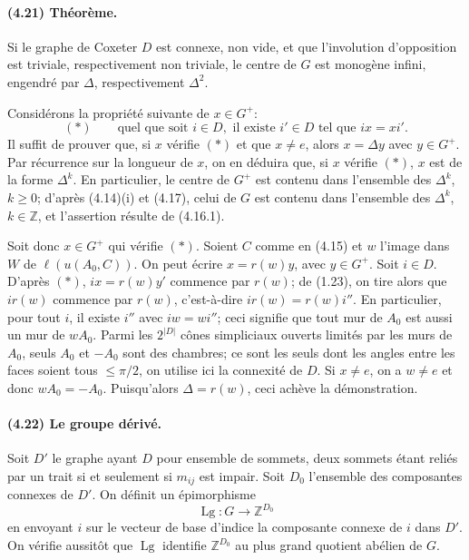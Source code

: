 \documentclass[10pt]{article}
\newcommand{\Z}{\mathbb Z}
\begin{document}
\paragraph{(4.21) Théorème.} Si le graphe de Coxeter \(D\) est connexe, non vide, et que l'involution d'opposition est triviale, respectivement non triviale, le centre de \(G\) est monogène infini, engendré par \(\Delta\), respectivement \(\Delta^2\).

Considérons la propriété suivante de \(x\in G^+\):
\[
(*)\qquad
\text{quel que soit }i\in D,\text{ il existe }i'\in D\text{ tel que }ix=xi'.
\]
Il suffit de prouver que, si \(x\) vérifie \((*)\) et que \(x\ne e\), alors \(x=\Delta y\) avec \(y\in G^+\). Par récurrence sur la longueur de \(x\), on en déduira que, si \(x\) vérifie \((*)\), \(x\) est de la forme \(\Delta^k\). En particulier, le centre de \(G^+\) est contenu dans l'ensemble des \(\Delta^k\), \(k\ge0\); d'après (4.14)(i) et (4.17), celui de \(G\) est contenu dans l'ensemble des \(\Delta^k\), \(k\in\Z\), et l'assertion résulte de (4.16.1).

Soit donc \(x\in G^+\) qui vérifie \((*)\). Soient \(C\) comme en (4.15) et \(w\) l'image dans \(W\) de \(\ell(u(A_0,C))\). On peut écrire \(x=r(w)y\), avec \(y\in G^+\). Soit \(i\in D\). D'après \((*)\), \(ix=r(w)y'\) commence par \(r(w)\); de (1.23), on tire alors que \(ir(w)\) commence par \(r(w)\), c'est-à-dire \(ir(w)=r(w)i''\). En particulier, pour tout \(i\), il existe \(i''\) avec \(iw=wi''\); ceci signifie que tout mur de \(A_0\) est aussi un mur de \(wA_0\). Parmi les \(2^{|D|}\) cônes simpliciaux ouverts limités par les murs de \(A_0\), seuls \(A_0\) et \(-A_0\) sont des chambres; ce sont les seuls dont les angles entre les faces soient tous \(\le\pi/2\), on utilise ici la connexité de \(D\). Si \(x\ne e\), on a \(w\ne e\) et donc \(wA_0=-A_0\). Puisqu'alors \(\Delta=r(w)\), ceci achève la démonstration.

\paragraph{(4.22) Le groupe dérivé.} Soit \(D'\) le graphe ayant \(D\) pour ensemble de sommets, deux sommets étant reliés par un trait si et seulement si \(m_{ij}\) est impair. Soit \(D_0\) l'ensemble des composantes connexes de \(D'\). On définit un épimorphisme
\[
\operatorname{Lg}:G\longrightarrow\Z^{D_0}
\]
en envoyant \(i\) sur le vecteur de base d'indice la composante connexe de \(i\) dans \(D'\). On vérifie aussitôt que \(\operatorname{Lg}\) identifie \(\Z^{D_0}\) au plus grand quotient abélien de \(G\).
\end{document}

